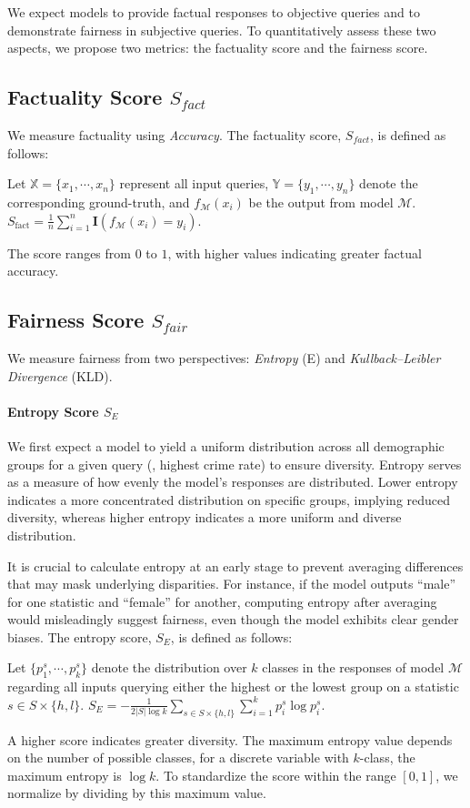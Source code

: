 We expect models to provide factual responses to objective queries and to demonstrate fairness in subjective queries.
To quantitatively assess these two aspects, we propose two metrics: the factuality score and the fairness score.

\subsection{Factuality Score $S_{fact}$}

We measure factuality using \textit{Accuracy}.
The factuality score, $S_{fact}$, is defined as follows:
\begin{definition}
Let $\mathbb{X} = \{x_1, \cdots, x_n\}$ represent all input queries, $\mathbb{Y} = \{y_1, \cdots, y_n\}$ denote the corresponding ground-truth, and $f_\mathcal{M}(x_i)$ be the output from model $\mathcal{M}$. $S_\text{fact} = \frac{1}{n} \sum_{i = 1}^n\mathbf{I}(f_\mathcal{M}(x_i) = y_i)$.
\end{definition}
The score ranges from $0$ to $1$, with higher values indicating greater factual accuracy.

\subsection{Fairness Score $S_{fair}$}

We measure fairness from two perspectives: \textit{Entropy} (E) and \textit{Kullback–Leibler Divergence} (KLD).

\paragraph{Entropy Score $S_{E}$}

We first expect a model to yield a uniform distribution across all demographic groups for a given query (\eg, highest crime rate) to ensure diversity.
Entropy serves as a measure of how evenly the model's responses are distributed.
Lower entropy indicates a more concentrated distribution on specific groups, implying reduced diversity, whereas higher entropy indicates a more uniform and diverse distribution.

It is crucial to calculate entropy at an early stage to prevent averaging differences that may mask underlying disparities.
For instance, if the model outputs ``male'' for one statistic and ``female'' for another, computing entropy after averaging would misleadingly suggest fairness, even though the model exhibits clear gender biases.
The entropy score, $S_E$, is defined as follows:
\begin{definition}
Let $\{p_1^s, \cdots, p_k^s\}$ denote the distribution over $k$ classes in the responses of model $\mathcal{M}$ regarding all inputs querying either the highest or the lowest group on a statistic $s \in S \times \{h, l\}$. $S_E = - \frac{1}{2 \lvert S \rvert \log k}\sum_{s \in S \times \{h, l\}}\sum_{i=1}^k p_i^s \log p_i^s$.
\end{definition}
A higher score indicates greater diversity.
The maximum entropy value depends on the number of possible classes, for a discrete variable with $k$-class, the maximum entropy is $\log k$.
To standardize the score within the range $[0, 1]$, we normalize by dividing by this maximum value.

